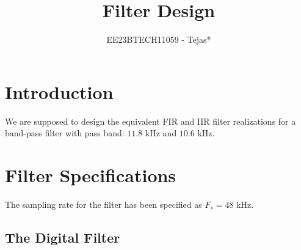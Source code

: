 \documentclass{article}
\begin{document}
\title{Filter Design}

\author{EE23BTECH11059 - Tejas*}

\maketitle
\section{Introduction}
We are supposed to design the equivalent FIR and IIR filter realizations for a band-pass filter with pass band: $11.8$ kHz and $10.6$ kHz.

\section{Filter Specifications}
The sampling rate for the filter has been specified as $F_s =  48$ kHz.	

\subsection{The Digital Filter}
\end{document}
